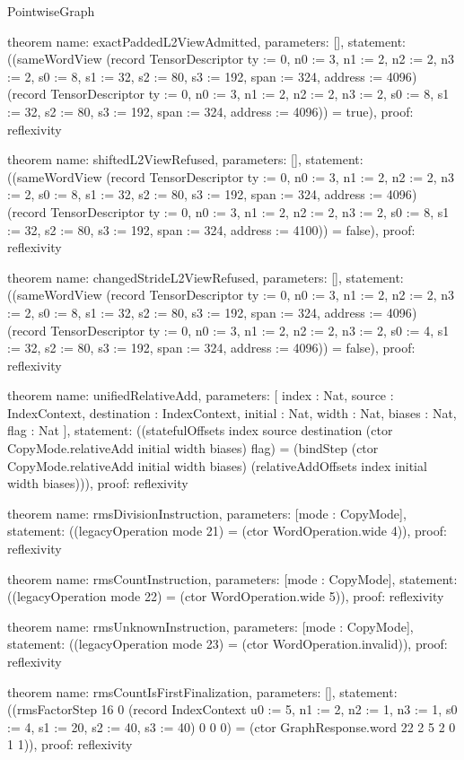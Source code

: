 \begin{lexlean}{PointwiseGraph}
\begin{semanticmodule}
theorem{
  name: exactPaddedL2ViewAdmitted,
  parameters: [],
  statement: ((sameWordView (record TensorDescriptor {ty := 0, n0 := 3, n1 := 2, n2 := 2, n3 := 2, s0 := 8, s1 := 32, s2 := 80, s3 := 192, span := 324, address := 4096}) (record TensorDescriptor {ty := 0, n0 := 3, n1 := 2, n2 := 2, n3 := 2, s0 := 8, s1 := 32, s2 := 80, s3 := 192, span := 324, address := 4096})) = true),
  proof: reflexivity{}
}

theorem{
  name: shiftedL2ViewRefused,
  parameters: [],
  statement: ((sameWordView (record TensorDescriptor {ty := 0, n0 := 3, n1 := 2, n2 := 2, n3 := 2, s0 := 8, s1 := 32, s2 := 80, s3 := 192, span := 324, address := 4096}) (record TensorDescriptor {ty := 0, n0 := 3, n1 := 2, n2 := 2, n3 := 2, s0 := 8, s1 := 32, s2 := 80, s3 := 192, span := 324, address := 4100})) = false),
  proof: reflexivity{}
}

theorem{
  name: changedStrideL2ViewRefused,
  parameters: [],
  statement: ((sameWordView (record TensorDescriptor {ty := 0, n0 := 3, n1 := 2, n2 := 2, n3 := 2, s0 := 8, s1 := 32, s2 := 80, s3 := 192, span := 324, address := 4096}) (record TensorDescriptor {ty := 0, n0 := 3, n1 := 2, n2 := 2, n3 := 2, s0 := 4, s1 := 32, s2 := 80, s3 := 192, span := 324, address := 4096})) = false),
  proof: reflexivity{}
}

theorem{
  name: unifiedRelativeAdd,
  parameters: [
    index : Nat,
    source : IndexContext,
    destination : IndexContext,
    initial : Nat,
    width : Nat,
    biases : Nat,
    flag : Nat
  ],
  statement: ((statefulOffsets index source destination (ctor CopyMode.relativeAdd initial width biases) flag) = (bindStep (ctor CopyMode.relativeAdd initial width biases) (relativeAddOffsets index initial width biases))),
  proof: reflexivity{}
}

theorem{
  name: rmsDivisionInstruction,
  parameters: [mode : CopyMode],
  statement: ((legacyOperation mode 21) = (ctor WordOperation.wide 4)),
  proof: reflexivity{}
}

theorem{
  name: rmsCountInstruction,
  parameters: [mode : CopyMode],
  statement: ((legacyOperation mode 22) = (ctor WordOperation.wide 5)),
  proof: reflexivity{}
}

theorem{
  name: rmsUnknownInstruction,
  parameters: [mode : CopyMode],
  statement: ((legacyOperation mode 23) = (ctor WordOperation.invalid)),
  proof: reflexivity{}
}

theorem{
  name: rmsCountIsFirstFinalization,
  parameters: [],
  statement: ((rmsFactorStep 16 0 (record IndexContext {u0 := 5, n1 := 2, n2 := 1, n3 := 1, s0 := 4, s1 := 20, s2 := 40, s3 := 40}) 0 0 0) = (ctor GraphResponse.word 22 2 5 2 0 1 1)),
  proof: reflexivity{}
}


\end{semanticmodule}
\end{lexlean}

